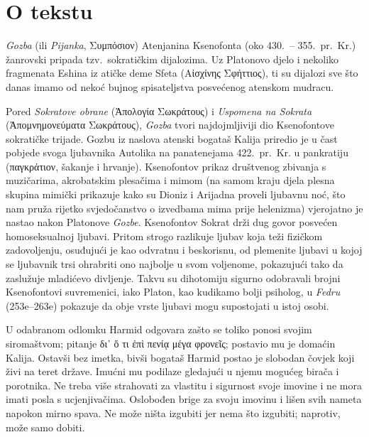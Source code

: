 

\section*{O tekstu}

\textit{Gozba} (ili \textit{Pijanka}, \textgreek[variant=ancient]{Συμπόσιον)} Atenjanina Ksenofonta (oko 430.\ – 355.\ pr.~Kr.) žanrovski pripada tzv.\ sokratičkim dijalozima. Uz Platonovo djelo i nekoliko fragmenata Eshina iz atičke deme Sfeta \textgreek[variant=ancient]{(Αἰσχίνης Σφήττιος),} ti su dijalozi sve što danas imamo od nekoć bujnog spisateljstva posvećenog atenskom mudracu. 

Pored \textit{Sokratove obrane} \textgreek[variant=ancient]{(Ἀπολογία Σωκράτους)} i \textit{Uspomena na Sokrata} \textgreek[variant=ancient]{(Ἀπομνημονεύματα Σωκράτους),} \textit{Gozba} tvori najdojmljiviji dio Ksenofontove sokratičke trijade. Gozbu iz naslova atenski bogataš Kalija priredio je u čast pobjede svoga ljubavnika Autolika na panatenejama 422.\ pr.~Kr. u pankratiju \textgreek[variant=ancient]{(παγκράτιον,} šakanje i hrvanje). Ksenofontov prikaz društvenog zbivanja s muzičarima, akrobatskim plesačima i mimom (na samom kraju djela plesna skupina mimički prikazuje kako su Dioniz i Arijadna proveli ljubavnu noć, što nam pruža rijetko svjedočanstvo o izvedbama mima prije helenizma) vjerojatno je nastao nakon Platonove \textit{Gozbe}. Ksenofontov Sokrat drži dug govor posvećen homoseksualnoj ljubavi. Pritom strogo razlikuje ljubav koja teži fizičkom zadovoljenju, osuđujući je kao odvratnu i beskorisnu, od plemenite ljubavi u kojoj se ljubavnik trsi ohrabriti ono najbolje u svom voljenome, pokazujući tako da zaslužuje mladićevo divljenje. Takvu su dihotomiju sigurno odobravali brojni Ksenofontovi suvremenici, iako Platon, kao kudikamo bolji psiholog, u \textit{Fedru} (253e–263e) pokazuje da obje vrste ljubavi mogu supostojati u istoj osobi. 

U odabranom odlomku Harmid odgovara zašto se toliko ponosi svojim siromaštvom; pitanje \textgreek[variant=ancient]{δι᾿ ὅ τι ἐπὶ πενίᾳ μέγα φρονεῖς;} postavio mu je domaćin Kalija. Ostavši bez imetka, bivši bogataš Harmid postao je slobodan čovjek koji živi na teret države. Imućni mu podilaze gledajući u njemu mogućeg birača i porotnika. Ne treba više strahovati za vlastitu i sigurnost svoje imovine i ne mora imati posla s ucjenjivačima. Oslobođen brige za svoju imovinu i lišen svih nameta napokon mirno spava. Ne može ništa izgubiti jer nema što izgubiti; naprotiv, može samo dobiti.

